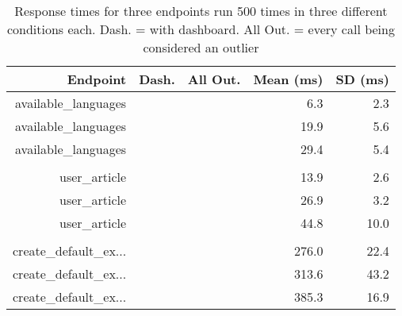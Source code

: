 
\newcommand{\yes}{\checkmark}

\begin{table}[tb]
	
	\centering

	\begin{tabular}{rllrr}
		\toprule
		\bfseries Endpoint & \bfseries Dash. & \bfseries All Out. & \bfseries Mean (ms) & \bfseries SD (ms) \\

		\midrule

	         available\_languages  &    &	    &   6.3 &  2.3 \\ 
	         available\_languages  &  \yes &    &  19.9 &  5.6 \\ 
	         available\_languages  &  \yes &  \yes &  29.4 &  5.4 \\ \\ 

	                user\_article  &    &	    &  13.9 &  2.6 \\
	                user\_article  &  \yes &    &  26.9 &  3.2 \\
	                user\_article  &  \yes &  \yes &  44.8 & 10.0 \\ \\

	    create\_default\_ex...     &    &	    &  276.0 & 22.4 \\ 
	    create\_default\_ex...     &  \yes &    & 313.6 & 43.2 \\
	    create\_default\_ex...     &  \yes &  \yes & 385.3 & 16.9 \\
	
		\bottomrule

	\end{tabular}
	\caption{Response times for three endpoints run 500 times in three different conditions each. Dash. = with dashboard. All Out. = every call being considered an outlier}
	\label{tab:benchmark}

\end{table}


